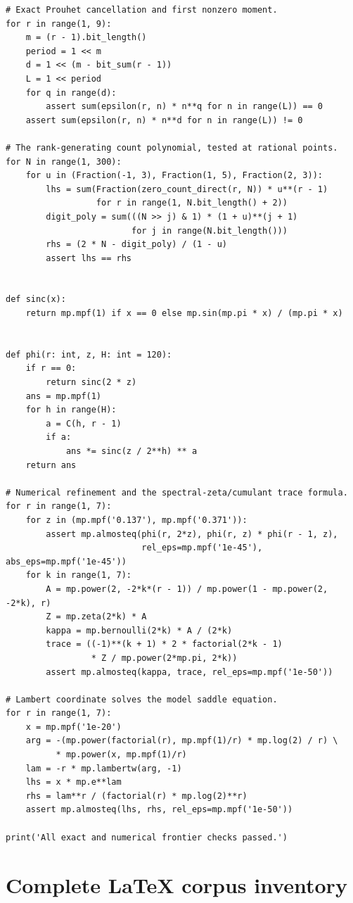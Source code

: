 \documentclass[11pt,a4paper]{article}
\theoremstyle{frontier}
\theoremstyle{definition}
\begin{document}
\begin{lstlisting}[style=frontiercode,caption={Exact and high-precision verification script.},label={lst:verification}]
# Exact Prouhet cancellation and first nonzero moment.
for r in range(1, 9):
    m = (r - 1).bit_length()
    period = 1 << m
    d = 1 << (m - bit_sum(r - 1))
    L = 1 << period
    for q in range(d):
        assert sum(epsilon(r, n) * n**q for n in range(L)) == 0
    assert sum(epsilon(r, n) * n**d for n in range(L)) != 0

# The rank-generating count polynomial, tested at rational points.
for N in range(1, 300):
    for u in (Fraction(-1, 3), Fraction(1, 5), Fraction(2, 3)):
        lhs = sum(Fraction(zero_count_direct(r, N)) * u**(r - 1)
                  for r in range(1, N.bit_length() + 2))
        digit_poly = sum(((N >> j) & 1) * (1 + u)**(j + 1)
                         for j in range(N.bit_length()))
        rhs = (2 * N - digit_poly) / (1 - u)
        assert lhs == rhs


def sinc(x):
    return mp.mpf(1) if x == 0 else mp.sin(mp.pi * x) / (mp.pi * x)


def phi(r: int, z, H: int = 120):
    if r == 0:
        return sinc(2 * z)
    ans = mp.mpf(1)
    for h in range(H):
        a = C(h, r - 1)
        if a:
            ans *= sinc(z / 2**h) ** a
    return ans

# Numerical refinement and the spectral-zeta/cumulant trace formula.
for r in range(1, 7):
    for z in (mp.mpf('0.137'), mp.mpf('0.371')):
        assert mp.almosteq(phi(r, 2*z), phi(r, z) * phi(r - 1, z),
                           rel_eps=mp.mpf('1e-45'), abs_eps=mp.mpf('1e-45'))
    for k in range(1, 7):
        A = mp.power(2, -2*k*(r - 1)) / mp.power(1 - mp.power(2, -2*k), r)
        Z = mp.zeta(2*k) * A
        kappa = mp.bernoulli(2*k) * A / (2*k)
        trace = ((-1)**(k + 1) * 2 * factorial(2*k - 1)
                 * Z / mp.power(2*mp.pi, 2*k))
        assert mp.almosteq(kappa, trace, rel_eps=mp.mpf('1e-50'))

# Lambert coordinate solves the model saddle equation.
for r in range(1, 7):
    x = mp.mpf('1e-20')
    arg = -(mp.power(factorial(r), mp.mpf(1)/r) * mp.log(2) / r) \
          * mp.power(x, mp.mpf(1)/r)
    lam = -r * mp.lambertw(arg, -1)
    lhs = x * mp.e**lam
    rhs = lam**r / (factorial(r) * mp.log(2)**r)
    assert mp.almosteq(lhs, rhs, rel_eps=mp.mpf('1e-50'))

print('All exact and numerical frontier checks passed.')
\end{lstlisting}

\section{Complete LaTeX corpus inventory}\label{app:corpus}
\end{document}
